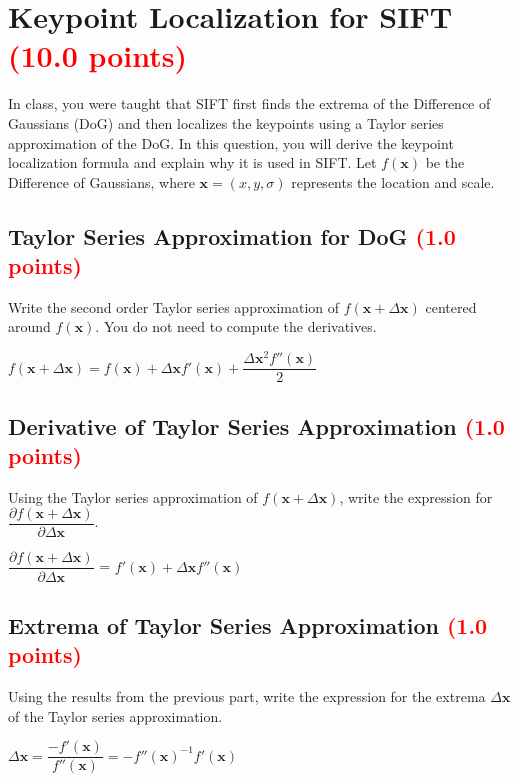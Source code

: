 \documentclass[answers]{exam}
\newcommand{\mypoints}[1]{\textcolor{red}{(#1 points)}}
\begin{document}
\newpage
\section{Keypoint Localization for SIFT \mypoints{10.0}}
In class, you were taught that SIFT first finds the extrema of the Difference of Gaussians (DoG) and then localizes the keypoints using a Taylor series approximation of the DoG. In this question, you will derive the keypoint localization formula and explain why it is used in SIFT. Let $f(\mathbf{x})$ be the Difference of Gaussians, where $\mathbf{x} = (x, y, \sigma)$ represents the location and scale.

\subsection{Taylor Series Approximation for DoG \mypoints{1.0}}
Write the second order Taylor series approximation of $f(\mathbf{x} + \Delta \mathbf{x})$ centered around $f(\mathbf{x})$. You do not need to compute the derivatives.
\begin{solution}
$f(\mathbf{x} + \Delta \mathbf{x}) = f( \mathbf{x}) + \Delta \mathbf{x}f'( \mathbf{x}) + \dfrac{\Delta \mathbf{x}^2f''( \mathbf{x})}{2} $
\end{solution}

\subsection{Derivative of Taylor Series Approximation \mypoints{1.0}}
Using the Taylor series approximation of $f(\mathbf{x} + \Delta \mathbf{x})$, write the expression for $\dfrac{\partial f(\mathbf{x} + \Delta \mathbf{x})}{\partial \Delta \mathbf{x}}$.
\begin{solution}
$\dfrac{\partial f(\mathbf{x} + \Delta \mathbf{x})}{\partial \Delta \mathbf{x}}$ = $f'(\mathbf{x}) + \Delta \mathbf{x}f''( \mathbf{x}) $
\end{solution}

\subsection{Extrema of Taylor Series Approximation \mypoints{1.0}}
Using the results from the previous part, write the expression for the extrema $\Delta \mathbf{x}$ of the Taylor series approximation.
\begin{solution}
$\Delta \mathbf{x}= \dfrac{-f'(\mathbf{x})}{f''(\mathbf{x})}  = -f''(\mathbf{x})^{-1} f'(\mathbf{x})$
\end{solution}
\end{document}
